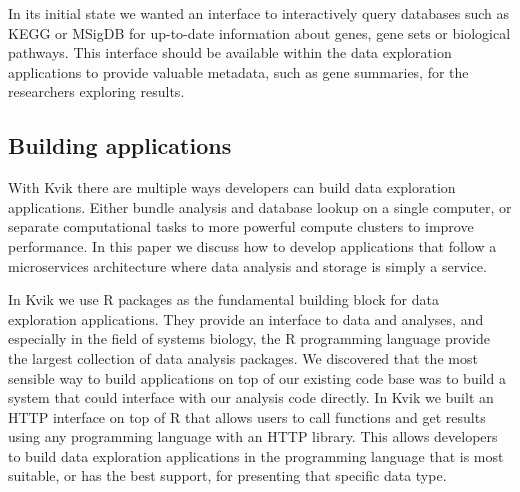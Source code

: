 In its initial state we wanted an interface to interactively query databases
such as KEGG or MSigDB for up-to-date information about genes, gene sets or
biological pathways. This interface should be available within the data
exploration applications to provide valuable metadata, such as gene summaries,
for the researchers exploring results.  




\subsection*{Building applications} 

With Kvik there are multiple ways developers can build data
exploration applications. Either bundle analysis and database lookup on a single
computer, or separate computational tasks to more powerful compute clusters to
improve performance. 
In this paper we discuss how to develop applications that follow a
microservices architecture where data analysis and storage is simply a service. 

In Kvik we use R packages as the fundamental building block for data exploration
applications. They provide an interface to data and analyses, and especially in
the field of systems biology, the R programming language provide the largest
collection of data analysis packages. %
We discovered that the most sensible way to build applications on top of our
existing code base was to build a system that could interface with our analysis
code directly. In Kvik we built an HTTP interface on top of R that allows users
to call functions and get results using any programming language with an HTTP
library. This allows developers to build data exploration applications in the
programming language that is most suitable, or has the best support, for
presenting that specific data type. 

